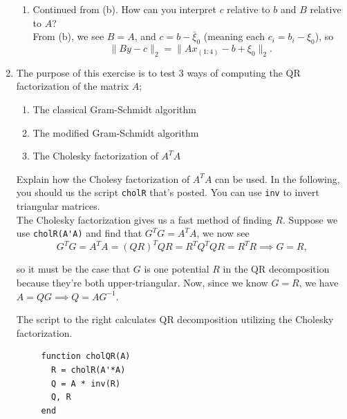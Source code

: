 \documentclass[11pt]{article}
\newcommand{\n}{\vspace{0.3cm}}
\begin{document}
\begin{enumerate}
\begin{enumerate}
		      \item Continued from (b).  How can you interpret \(c\) relative to \(b\) and \(B\) relative to \(A\)? \n\\
		            From (b), we see \(B = A\), and \(c = b - \bar\xi_0\) (meaning each \(c_i = b_i - \xi_0\)), so
		            \[\lVert By - c \rVert_2 = \lVert Ax_{(1:4)} - b + \xi_0 \rVert_2.\]
	      \end{enumerate} \n

	\item The purpose of this exercise is to test 3 ways of computing the QR factorization of the matrix \(A\);
	      \begin{enumerate}
		      \item The classical Gram-Schmidt algorithm
		      \item The modified Gram-Schmidt algorithm
		      \item The Cholesky factorization of \(A^T A\)
	      \end{enumerate}

	      Explain how the Cholesy factorization of \(A^T A\) can be used.  In the following, you should us the script \verb!cholR! that's posted.  You can use \verb!inv! to invert triangular matrices. \n\\
	      The Cholesky factorization gives us a fast method of finding \(R\).  Suppose we use \verb$cholR(A'A)$ and find that \(G^T G = A^T A\), we now see
	      \[G^T G = A^T A = (QR)^T QR = R^T Q^T QR = R^T R \implies G = R,\]
	      \begin{minipage}{0.65\textwidth}
		      so it must be the case that \(G\) is one potential \(R\) in the QR decomposition because they're both upper-triangular.  Now, since we know \(G = R\), we have \(A = QG \implies Q = AG^{-1}\). \n

		      The script to the right calculates QR decomposition utilizing the Cholesky factorization.
	      \end{minipage}
	      \begin{minipage}{0.35\textwidth}
		      \begin{verbatim}
     function cholQR(A)
       R = cholR(A'*A)
       Q = A * inv(R)
       Q, R
     end
        \end{verbatim}
	      \end{minipage} \n


\end{enumerate}
\end{document}
